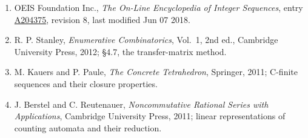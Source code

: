 \documentclass[11pt]{article}
\theoremstyle{definition}
\begin{document}
\begin{enumerate}

\item OEIS Foundation Inc., \emph{The On-Line Encyclopedia of Integer Sequences}, entry \href{https://oeis.org/A204375}{A204375}, revision 8, last modified Jun 07 2018.

\item R. P. Stanley, \emph{Enumerative Combinatorics}, Vol.~1, 2nd ed., Cambridge University Press, 2012; \S4.7, the transfer-matrix method.

\item M. Kauers and P. Paule, \emph{The Concrete Tetrahedron}, Springer, 2011; C-finite sequences and their closure properties.

\item J. Berstel and C. Reutenauer, \emph{Noncommutative Rational Series with Applications}, Cambridge University Press, 2011; linear representations of counting automata and their reduction.

\end{enumerate}
\end{document}
